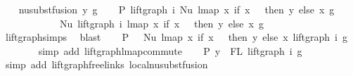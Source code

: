 \begin{isabellebody}
\ \ \isamarkupfalse%
\ {\isacharparenleft}{\kern0pt}nu{\isacharunderscore}{\kern0pt}subst{\isacharunderscore}{\kern0pt}fusion{}\ y\ g{\isacharparenright}{\kern0pt}\isanewline
\ \ \isamarkupfalse%
\ P{}{\isacharcolon}{\kern0pt}\ {\isachardoublequoteopen}lift{\isacharunderscore}{\kern0pt}graph\ i\ {\isacharparenleft}{\kern0pt}Nu\ {\isacharparenleft}{\kern0pt}lmap\ {\isacharparenleft}{\kern0pt}{\isasymlambda}x{\isachardot}{\kern0pt}\ if\ x\ {\isacharequal}{\kern0pt}\ {}\ then\ y\ else\ x{\isacharparenright}{\kern0pt}\ g{\isacharparenright}{\kern0pt}{\isacharparenright}{\kern0pt}\ {\isacharequal}{\kern0pt}\isanewline
\ \ \ \ \ \ \ \ \ \ \ \ Nu\ {\isacharparenleft}{\kern0pt}lift{\isacharunderscore}{\kern0pt}graph\ i\ {\isacharparenleft}{\kern0pt}lmap\ {\isacharparenleft}{\kern0pt}{\isasymlambda}x{\isachardot}{\kern0pt}\ if\ x\ {\isacharequal}{\kern0pt}\ {}\ then\ y\ else\ x{\isacharparenright}{\kern0pt}\ g{\isacharparenright}{\kern0pt}{\isacharparenright}{\kern0pt}{\isachardoublequoteclose}\isanewline
\ \ \ \ \ \ \isamarkupfalse%
\ lift{\isacharunderscore}{\kern0pt}graph{\isachardot}{\kern0pt}simps{\isacharparenleft}{\kern0pt}{}{\isacharparenright}{\kern0pt}\ \isamarkupfalse%
\ blast\isanewline
\ \ \isamarkupfalse%
\ P{}{\isacharcolon}{\kern0pt}\ {\isachardoublequoteopen}{\isachardot}{\kern0pt}{\isachardot}{\kern0pt}{\isachardot}{\kern0pt}\ {\isacharequal}{\kern0pt}\ Nu\ {\isacharparenleft}{\kern0pt}lmap\ {\isacharparenleft}{\kern0pt}{\isasymlambda}x{\isachardot}{\kern0pt}\ if\ x\ {\isacharequal}{\kern0pt}\ {}\ then\ y\ else\ x{\isacharparenright}{\kern0pt}\ {\isacharparenleft}{\kern0pt}lift{\isacharunderscore}{\kern0pt}graph\ i\ g{\isacharparenright}{\kern0pt}{\isacharparenright}{\kern0pt}{\isachardoublequoteclose}\isanewline
\ \ \ \ \ \ \isamarkupfalse%
\ {\isacharparenleft}{\kern0pt}simp\ add{\isacharcolon}{\kern0pt}\ lift{\isacharunderscore}{\kern0pt}graph{\isacharunderscore}{\kern0pt}lmap{\isacharunderscore}{\kern0pt}commute{\isacharparenright}{\kern0pt}\isanewline
\ \ \isamarkupfalse%
\ P{}{\isacharcolon}{\kern0pt}\ {\isachardoublequoteopen}y\ {\isasymin}\ FL\ {\isacharparenleft}{\kern0pt}lift{\isacharunderscore}{\kern0pt}graph\ i\ g{\isacharparenright}{\kern0pt}{\isachardoublequoteclose}\isanewline
\ \ \ \ \ \isamarkupfalse%
\ {\isacharparenleft}{\kern0pt}simp\ add{\isacharcolon}{\kern0pt}\ lift{\isacharunderscore}{\kern0pt}graph{\isacharunderscore}{\kern0pt}freelinks\ local{\isachardot}{\kern0pt}nu{\isacharunderscore}{\kern0pt}subst{\isacharunderscore}{\kern0pt}fusion{}{\isacharparenright}{\kern0pt}\isanewline

\end{isabellebody}
